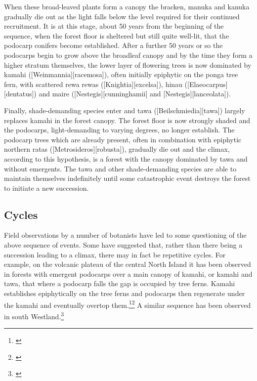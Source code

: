 When these broad-leaved plants form a canopy the bracken, manuka and kanuka gradually die out as the light falls below the level required for their continued recruitment.
It is at this stage, about 50 years from the beginning of the sequence, when the forest floor is sheltered but still quite well-lit, that the podocarp conifers become established.
After a further 50 years or so the podocarps begin to grow above the broadleaf canopy and by the time they form a higher stratum themselves, the lower layer of flowering trees is now dominated by kamahi ([Weinmannia][racemosa]), often initially epiphytic on the ponga tree fern, with scattered rewa rewas ([Knightia][excelsa]), hinau ([Elaeocarpus][dentatus]) and maire ([Nestegis][cunninghamii] and [Nestegis][lanceolata]).

Finally, shade-demanding species enter and tawa ([Beilschmiedia][tawa]) largely replaces kamahi in the forest canopy.
The forest floor is now strongly shaded and the podocarps, light-demanding to varying degrees, no longer establish.
The podocarp trees which are already present, often in combination with epiphytic northern ratas ([Metrosideros][robusta]), gradually die out and the climax, according to this hypothesis, is a forest with the canopy dominated by tawa and without emergents.
The tawa and other shade-demanding species are able to maintain themselves indefinitely until some catastrophic event destroys the forest to initiate a new succession.

\subsection[Cycles]{Cycles}

Field observations by a number of botanists have led to some questioning of the above sequence of events.
Some have suggested that, rather than there being a succession leading to a climax, there may in fact be repetitive cycles.
For example, on the volcanic plateau of the central North Island it has been observed in forests with emergent podocarps over a main canopy of kamahi, or kamahi and tawa, that where a podocarp falls the gap is occupied by tree ferns.
Kamahi establishes epiphytically on the tree ferns and podocarps then regenerate under the kamahi and eventually overtop them.\footnote{\cite{cameron1955mosaic}}\footnote{\cite{beveridge1973regeneration}} A similar sequence has been observed in south Westland.\footnote{\cite{poole1937survey}}

